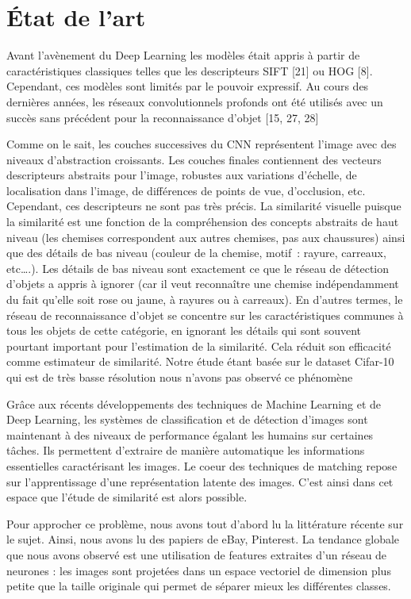 \section{État de l'art}

Avant l’avènement du Deep Learning les modèles était appris à partir de caractéristiques classiques telles que les
descripteurs SIFT [21] ou HOG [8]. Cependant, ces modèles sont limités par le pouvoir expressif. Au cours des dernières
années, les réseaux convolutionnels profonds ont été utilisés avec un succès sans précédent pour la reconnaissance
d'objet [15, 27, 28]

Comme on le sait, les couches successives du CNN représentent l'image avec des niveaux d'abstraction croissants. Les
couches finales contiennent des vecteurs descripteurs abstraits pour l’image, robustes aux variations d’échelle, de
localisation dans l’image, de différences de points de vue, d’occlusion, etc. Cependant, ces descripteurs ne sont pas
très précis. La similarité visuelle puisque la similarité est une fonction de la compréhension des concepts abstraits de
haut niveau (les chemises correspondent aux autres chemises, pas aux chaussures) ainsi que des détails de bas niveau
(couleur de la chemise, motif : rayure, carreaux, etc….). Les détails de bas niveau sont exactement ce que le réseau de
détection d'objets a appris à ignorer (car il veut reconnaître une chemise indépendamment du fait qu’elle soit rose ou
jaune, à rayures ou à carreaux). En d'autres termes, le réseau de reconnaissance d’objet se concentre sur les
caractéristiques communes à tous les objets de cette catégorie, en ignorant les détails qui sont souvent pourtant
important pour l'estimation de la similarité. Cela réduit son efficacité comme estimateur de similarité. Notre étude
étant basée sur le dataset Cifar-10 qui est de très basse résolution nous n’avons pas observé ce phénomène

Grâce aux récents développements des techniques de Machine Learning et de Deep Learning, les systèmes de classification
et de détection d’images sont maintenant à des niveaux de performance égalant les humains sur certaines tâches. Ils
permettent d’extraire de manière automatique les informations essentielles caractérisant les images.  Le coeur des
techniques de matching repose sur l’apprentissage d’une représentation latente des images. C’est ainsi dans cet espace
que l’étude de similarité est alors possible.

Pour approcher ce problème, nous avons tout d'abord lu la littérature récente sur le sujet. Ainsi, nous avons lu des
papiers de eBay, Pinterest. La tendance globale que nous avons observé est une utilisation de features extraites d'un
réseau de neurones : les images sont projetées dans un espace vectoriel de dimension plus petite que la taille
originale qui permet de séparer mieux les différentes classes.

